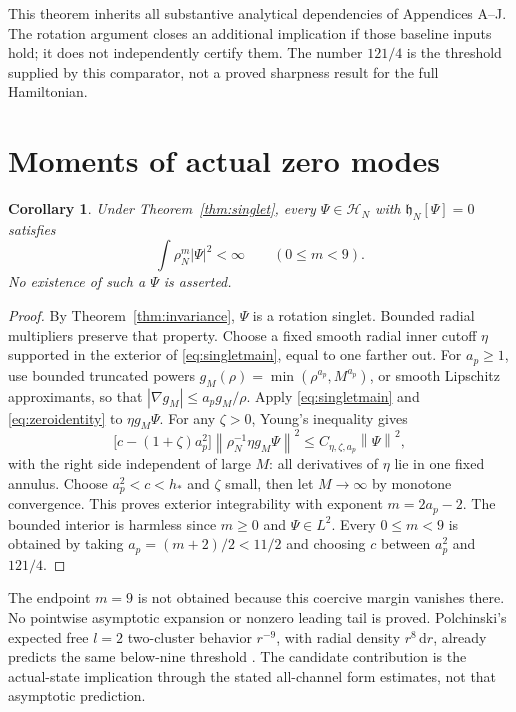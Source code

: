 \documentclass[11pt,letterpaper]{article}
\newtheorem{corollary}[theorem]{Corollary}
\theoremstyle{definition}\newtheorem{hypothesis}[theorem]{Hypothesis}
\newcommand{\dd}{\,\mathrm{d}}
\newcommand{\hh}{\mathfrak h}
\newcommand{\norm}[1]{\left\lVert #1\right\rVert}
\numberwithin{equation}{section}
\begin{document}
This theorem inherits all substantive analytical dependencies of Appendices A--J. The rotation argument closes an additional implication if those baseline inputs hold; it does not independently certify them. The number $121/4$ is the threshold supplied by this comparator, not a proved sharpness result for the full Hamiltonian.

\section{Moments of actual zero modes}
\begin{corollary}\label{cor:moments}
Under Theorem~\ref{thm:singlet}, every $\Psi\in\mathscr H_N$ with $\hh_N[\Psi]=0$ satisfies
\begin{equation}
 \int\rho_N^m|\Psi|^2<\infty\qquad(0\le m<9).
\end{equation}
No existence of such a $\Psi$ is asserted.
\end{corollary}
\begin{proof}
By Theorem~\ref{thm:invariance}, $\Psi$ is a rotation singlet. Bounded radial multipliers preserve that property. Choose a fixed smooth radial inner cutoff $\eta$ supported in the exterior of \eqref{eq:singletmain}, equal to one farther out. For $a_p\ge1$, use bounded truncated powers $g_M(\rho)=\min(\rho^{a_p},M^{a_p})$, or smooth Lipschitz approximants, so that $|\nabla g_M|\le a_pg_M/\rho$. Apply \eqref{eq:singletmain} and \eqref{eq:zeroidentity} to $\eta g_M\Psi$. For any $\zeta>0$, Young's inequality gives
\begin{equation}
 \bigl[c-(1+\zeta)a_p^2\bigr]\norm{\rho_N^{-1}\eta g_M\Psi}^2
 \le C_{\eta,\zeta,a_p}\norm{\Psi}^2,
\end{equation}
with the right side independent of large $M$: all derivatives of $\eta$ lie in one fixed annulus. Choose $a_p^2<c<h_*$ and $\zeta$ small, then let $M\to\infty$ by monotone convergence. This proves exterior integrability with exponent $m=2a_p-2$. The bounded interior is harmless since $m\ge0$ and $\Psi\in L^2$. Every $0\le m<9$ is obtained by taking $a_p=(m+2)/2<11/2$ and choosing $c$ between $a_p^2$ and $121/4$.
\end{proof}
The endpoint $m=9$ is not obtained because this coercive margin vanishes there. No pointwise asymptotic expansion or nonzero leading tail is proved. Polchinski's expected free $l=2$ two-cluster behavior $r^{-9}$, with radial density $r^8\dd r$, already predicts the same below-nine threshold \cite{P}. The candidate contribution is the actual-state implication through the stated all-channel form estimates, not that asymptotic prediction.
\end{document}
